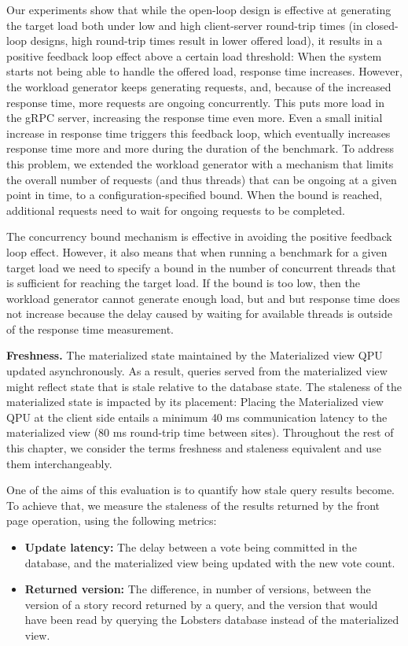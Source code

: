 Our experiments show that while the open-loop design is effective at generating the target load
both under low and high client-server round-trip times (in closed-loop designs, high round-trip times result in lower offered load),
it results in a positive feedback loop effect above a certain load threshold:
When the system starts not being able to handle the offered load, response time increases.
However, the workload generator keeps generating requests, and, because of the increased response time,
more requests are ongoing concurrently.
This puts more load in the gRPC server, increasing the response time even more.
Even a small initial increase in response time triggers this feedback loop,
which eventually increases response time more and more during the duration of the benchmark.
To address this problem, we extended the workload generator with a mechanism that limits the overall number of requests
(and thus threads) that can be ongoing at a given point in time, to a configuration-specified bound.
When the bound is reached, additional requests need to wait for ongoing requests to be completed.

The concurrency bound mechanism is effective in avoiding the positive feedback loop effect.
However, it also means that when running a benchmark for a given target load we need to specify a bound in the number of
concurrent threads that is sufficient for reaching the target load.
If the bound is too low, then the workload generator cannot generate enough load, but and but response time does not
increase because the delay caused by waiting for available threads is outside of the response time measurement.

\bigskip
\noindent
\textbf{Freshness.} The materialized state maintained by the Materialized view QPU updated asynchronously.
As a result, queries served from the materialized view might reflect state that is stale relative to the database state.
The staleness of the materialized state is impacted by its placement:
Placing the Materialized view QPU at the client side entails a minimum 40 ms communication latency to the materialized view
(80 ms round-trip time between sites).
Throughout the rest of this chapter, we consider the terms freshness and staleness equivalent and use them interchangeably.

One of the aims of this evaluation is to quantify how stale query results become.
To achieve that, we measure the staleness of the results returned by the front page operation,
using the following metrics:
\begin{itemize}
  \item \textbf{Update latency:} The delay between a vote being committed in the database, and the materialized view being
  updated with the new vote count.
  \item \textbf{Returned version:} The difference, in number of versions, between the version of a story record returned by a query,
  and the version that would have been read by querying the Lobsters database instead of the materialized view.
\end{itemize}

